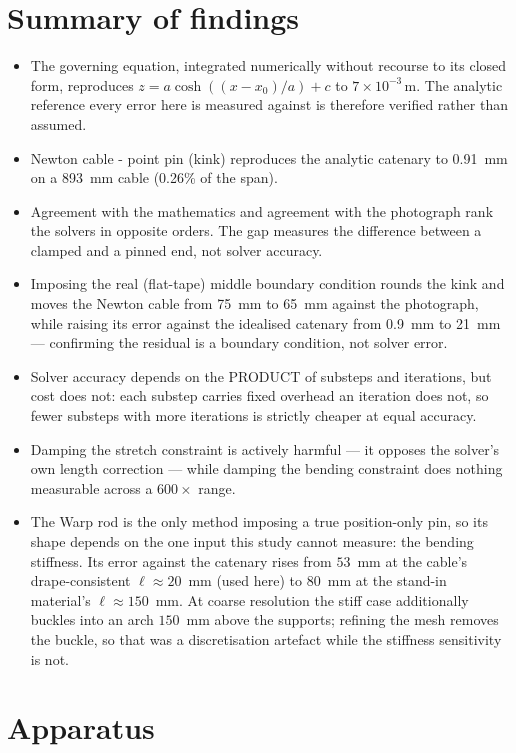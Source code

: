 \documentclass[11pt,a4paper]{article}
\begin{document}
\section*{Summary of findings}
\begin{itemize}
  \item The governing equation, integrated numerically without recourse to its closed form, reproduces $z = a\cosh((x-x_0)/a)+c$ to $7\times10^{-3}$\,\textmu m. The analytic reference every error here is measured against is therefore verified rather than assumed.
  \item Newton cable - point pin (kink) reproduces the analytic catenary to 0.91~mm on a 893~mm cable (0.26\% of the span).
  \item Agreement with the mathematics and agreement with the photograph rank the solvers in opposite orders. The gap measures the difference between a clamped and a pinned end, not solver accuracy.
  \item Imposing the real (flat-tape) middle boundary condition rounds the kink and moves the Newton cable from 75~mm to 65~mm against the photograph, while raising its error against the idealised catenary from 0.9~mm to 21~mm --- confirming the residual is a boundary condition, not solver error.
  \item Solver accuracy depends on the PRODUCT of substeps and iterations, but cost does not: each substep carries fixed overhead an iteration does not, so fewer substeps with more iterations is strictly cheaper at equal accuracy.
  \item Damping the stretch constraint is actively harmful --- it opposes the solver's own length correction --- while damping the bending constraint does nothing measurable across a $600\times$ range.
  \item The Warp rod is the only method imposing a true position-only pin, so its shape depends on the one input this study cannot measure: the bending stiffness. Its error against the catenary rises from $53$~mm at the cable's drape-consistent $\ell\approx20$~mm (used here) to $80$~mm at the stand-in material's $\ell\approx150$~mm. At coarse resolution the stiff case additionally buckles into an arch $150$~mm above the supports; refining the mesh removes the buckle, so that was a discretisation artefact while the stiffness sensitivity is not.
\end{itemize}

\section{Apparatus}
\end{document}
